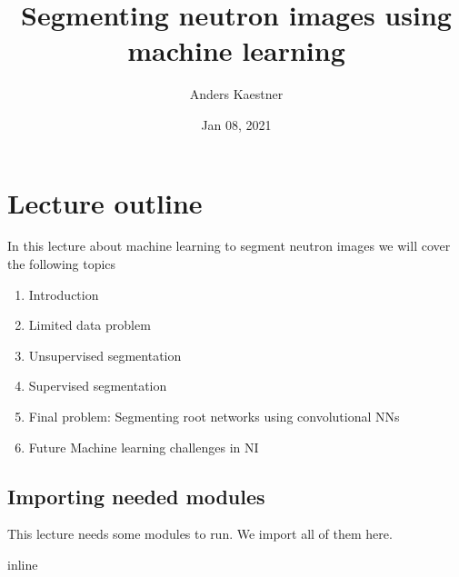 \documentclass[letterpaper,10pt,english]{sphinxmanual}
\title{Segmenting neutron images using machine learning}
\date{Jan 08, 2021}
\author{Anders Kaestner}
\begin{document}
\pagestyle{empty}
\sphinxmaketitle
\pagestyle{plain}
\sphinxtableofcontents
\pagestyle{normal}
\label{\detokenize{ML4NeutronImageSegmentation::doc}}





\chapter{Lecture outline}
\label{\detokenize{ML4NeutronImageSegmentation:lecture-outline}}
In this lecture about machine learning to segment neutron images we will cover the following topics
\begin{enumerate}
%
\item {} 
Introduction

\item {} 
Limited data problem

\item {} 
Unsupervised segmentation

\item {} 
Supervised segmentation

\item {} 
Final problem: Segmenting root networks using convolutional NNs

\item {} 
Future Machine learning challenges in NI

\end{enumerate}


\section{Importing needed modules}
\label{\detokenize{ML4NeutronImageSegmentation:importing-needed-modules}}
This lecture needs some modules to run. We import all of them here.

\begin{sphinxVerbatim}[commandchars=\\\{\}]
 inline
   
   
   
   

   
 
   
\PYG{p}{[}\PYG{p}{]}  
\end{sphinxVerbatim}
\end{document}
